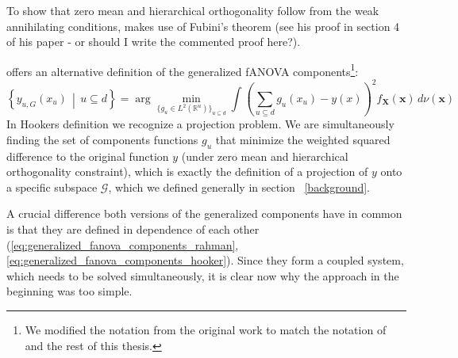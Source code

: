 To show that zero mean and hierarchical orthogonality follow from the weak annihilating conditions, \cite{rahman2014} makes use of Fubini's theorem (see his proof in section 4 of his paper - or should I write the commented proof here?).\par

\cite{hooker2007} offers an alternative definition of the generalized fANOVA components\footnote{We modified the notation from the original work to match the notation of \cite{rahman2014} and the rest of this thesis.}:
\begin{equation}
\left\{ y_{u, G}(x_u) \,\middle|\, u \subseteq d \right\}
= \arg\min_{\{g_u \in L^2(\mathbb{R}^u)\}_{u \subseteq d}} 
\int \left( \sum_{u \subseteq d} g_u(x_u) - y(x) \right)^2 f_{\boldsymbol{X}}(\boldsymbol{x}) \, d \nu (\boldsymbol{x})
\label{eq:generalized_fanova_components_hooker}
\end{equation}
In Hookers definition we recognize a projection problem. We are simultaneously finding the set of components functions $g_u$ that minimize the weighted squared difference to the original function $y$ (under zero mean and hierarchical orthogonality constraint), which is exactly the definition of a projection of $y$ onto a specific subspace $\mathcal{G}$, which we defined generally in section ~\ref{background}.\par

A crucial difference both versions of the generalized components have in common is that they are defined in dependence of each other (\autoref{eq:generalized_fanova_components_rahman}, \autoref{eq:generalized_fanova_components_hooker}).
Since they form a coupled system, which needs to be solved simultaneously, it is clear now why the approach in the beginning was too simple.





